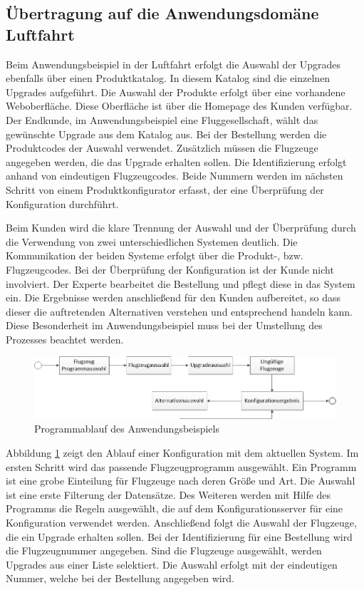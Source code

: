 \subsection{Übertragung auf die Anwendungsdomäne Luftfahrt}
Beim Anwendungsbeispiel in der Luftfahrt erfolgt die Auswahl der Upgrades ebenfalls über einen Produktkatalog. In diesem Katalog sind die einzelnen Upgrades aufgeführt. Die Auswahl der Produkte erfolgt über eine vorhandene Weboberfläche. Diese Oberfläche ist über die Homepage des Kunden verfügbar. Der Endkunde, im Anwendungsbeispiel eine Fluggesellschaft, wählt das gewünschte Upgrade aus dem Katalog aus. Bei der Bestellung werden die Produktcodes der Auswahl verwendet. Zusätzlich müssen die Flugzeuge angegeben werden, die das Upgrade erhalten sollen. Die Identifizierung erfolgt anhand von eindeutigen Flugzeugcodes. Beide Nummern werden im nächsten Schritt von einem Produktkonfigurator erfasst, der eine Überprüfung der Konfiguration durchführt.   \par 

Beim Kunden wird die klare Trennung der Auswahl und der Überprüfung durch die Verwendung von zwei unterschiedlichen Systemen deutlich. Die Kommunikation der beiden Systeme erfolgt über die Produkt-, bzw. Flugzeugcodes. Bei der Überprüfung der Konfiguration ist der Kunde  nicht involviert. Der Experte bearbeitet die Bestellung und pflegt diese in das System ein. Die Ergebnisse werden anschließend für den Kunden aufbereitet, so dass dieser die auftretenden Alternativen verstehen und entsprechend handeln kann. Diese Besonderheit im Anwendungsbeispiel muss bei der Umstellung des Prozesses beachtet werden. \par 
\begin{figure}[H]
\centering
\includegraphics[width=\hsize]{images/workflow_webgui}
\caption{Programmablauf des Anwendungsbeispiels}
\label{webguiAblauf}
\end{figure}

Abbildung \ref{webguiAblauf} zeigt den Ablauf einer Konfiguration mit dem aktuellen System.
Im ersten Schritt wird das passende Flugzeugprogramm ausgewählt. Ein Programm ist eine grobe Einteilung für Flugzeuge nach deren Größe und Art. Die Auswahl ist eine erste Filterung der Datensätze. Des Weiteren werden mit Hilfe des Programms die Regeln ausgewählt, die auf dem Konfigurationsserver für eine Konfiguration verwendet werden. Anschließend folgt die Auswahl der Flugzeuge, die ein Upgrade erhalten sollen. Bei der Identifizierung für eine Bestellung wird die Flugzeugnummer angegeben. Sind die Flugzeuge ausgewählt, werden Upgrades aus einer Liste selektiert. Die Auswahl erfolgt mit der eindeutigen Nummer, welche bei der Bestellung angegeben wird. \par 

